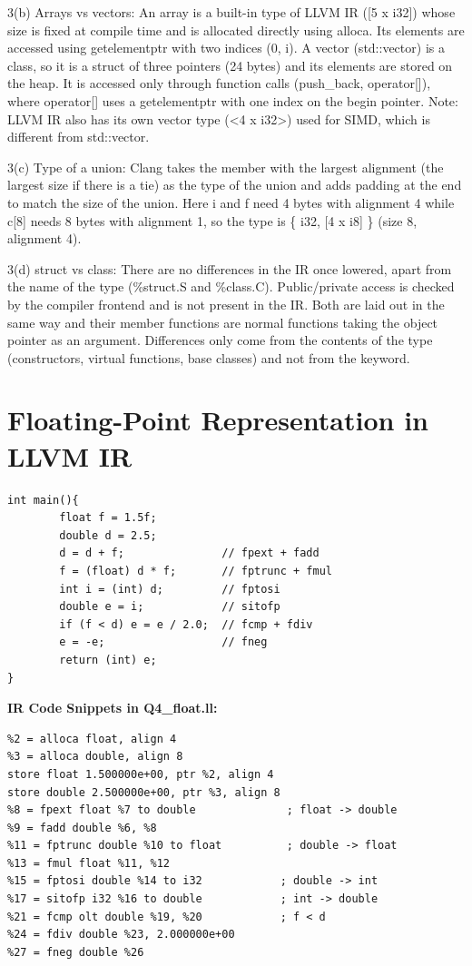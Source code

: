 3(b) Arrays vs vectors: An array is a built-in type of LLVM IR ([5 x i32]) whose size is fixed at compile time and is allocated directly using alloca. Its elements are accessed using getelementptr with two indices (0, i). A vector (std::vector) is a class, so it is a struct of three pointers (24 bytes) and its elements are stored on the heap. It is accessed only through function calls (push\_back, operator[]), where operator[] uses a getelementptr with one index on the begin pointer. Note: LLVM IR also has its own vector type (\textless{}4 x i32\textgreater{}) used for SIMD, which is different from std::vector.


3(c) Type of a union: Clang takes the member with the largest alignment (the largest size if there is a tie) as the type of the union and adds padding at the end to match the size of the union. Here i and f need 4 bytes with alignment 4 while c[8] needs 8 bytes with alignment 1, so the type is \{ i32, [4 x i8] \} (size 8, alignment 4).


3(d) struct vs class: There are no differences in the IR once lowered, apart from the name of the type (\%struct.S and \%class.C). Public/private access is checked by the compiler frontend and is not present in the IR. Both are laid out in the same way and their member functions are normal functions taking the object pointer as an argument. Differences only come from the contents of the type (constructors, virtual functions, base classes) and not from the keyword.


\section{Floating-Point Representation in LLVM IR}

\begin{lstlisting}
int main(){
        float f = 1.5f;
        double d = 2.5;
        d = d + f;               // fpext + fadd
        f = (float) d * f;       // fptrunc + fmul
        int i = (int) d;         // fptosi
        double e = i;            // sitofp
        if (f < d) e = e / 2.0;  // fcmp + fdiv
        e = -e;                  // fneg
        return (int) e;
}
\end{lstlisting}

\medskip\noindent\textbf{IR Code Snippets in Q4\_float.ll:}\par

\begin{lstlisting}
%2 = alloca float, align 4
%3 = alloca double, align 8
store float 1.500000e+00, ptr %2, align 4
store double 2.500000e+00, ptr %3, align 8
%8 = fpext float %7 to double              ; float -> double
%9 = fadd double %6, %8
%11 = fptrunc double %10 to float          ; double -> float
%13 = fmul float %11, %12
%15 = fptosi double %14 to i32            ; double -> int
%17 = sitofp i32 %16 to double            ; int -> double
%21 = fcmp olt double %19, %20            ; f < d
%24 = fdiv double %23, 2.000000e+00
%27 = fneg double %26
\end{lstlisting}

